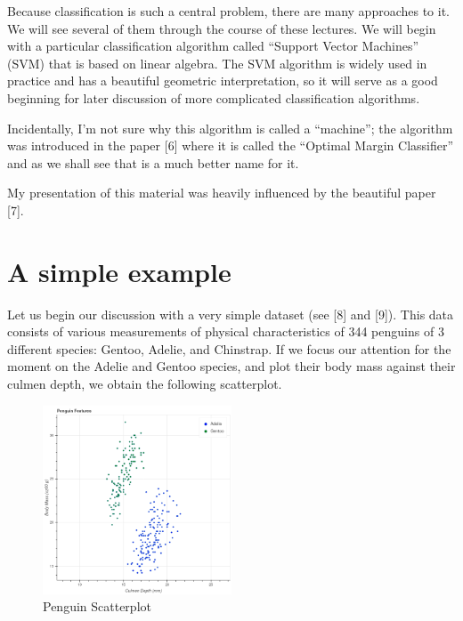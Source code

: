 \documentclass[
  11pt,
  letterpaper,
]{scrbook}
\theoremstyle{plain}
\theoremstyle{plain}
\theoremstyle{remark}
\begin{document}
Because classification is such a central problem, there are many
approaches to it. We will see several of them through the course of
these lectures. We will begin with a particular classification algorithm
called ``Support Vector Machines'' (SVM) that is based on linear
algebra. The SVM algorithm is widely used in practice and has a
beautiful geometric interpretation, so it will serve as a good beginning
for later discussion of more complicated classification algorithms.

Incidentally, I'm not sure why this algorithm is called a ``machine'';
the algorithm was introduced in the paper {[}6{]} where it is called the
``Optimal Margin Classifier'' and as we shall see that is a much better
name for it.

My presentation of this material was heavily influenced by the beautiful
paper {[}7{]}.

\hypertarget{a-simple-example}{%
\section{A simple example}\label{a-simple-example}}

Let us begin our discussion with a very simple dataset (see {[}8{]} and
{[}9{]}). This data consists of various measurements of physical
characteristics of 344 penguins of 3 different species: Gentoo, Adelie,
and Chinstrap. If we focus our attention for the moment on the Adelie
and Gentoo species, and plot their body mass against their culmen depth,
we obtain the following scatterplot.

\begin{figure}

{\centering \includegraphics[width=0.5\textwidth,height=\textheight]{chapters/img/penguins.png}

}

\caption{\label{fig-penguins}Penguin Scatterplot}

\end{figure}
\end{document}
